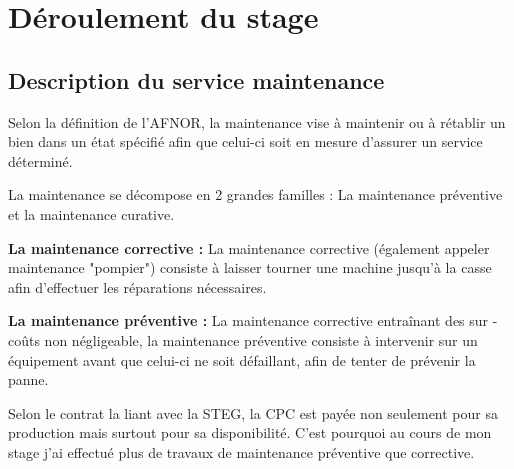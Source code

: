 \chapter{Déroulement du stage}

\section{Description du service maintenance}
Selon la définition de l'AFNOR, la maintenance vise à maintenir ou à rétablir un bien dans un état spécifié afin que celui-ci soit en mesure d'assurer un service déterminé.

La maintenance se décompose en 2 grandes familles : La maintenance préventive et la maintenance curative.

\textbf{La maintenance corrective : }La maintenance corrective (également appeler maintenance "pompier") consiste à laisser tourner une machine jusqu'à la casse afin d'effectuer les réparations nécessaires.

\textbf{La maintenance préventive : }La maintenance corrective entraînant des sur -coûts non négligeable, la maintenance préventive consiste à intervenir sur un équipement avant que celui-ci ne soit défaillant, afin de tenter de prévenir la panne. 

Selon le contrat la liant avec la STEG, la CPC est payée non seulement pour sa production mais surtout pour sa disponibilité. C'est pourquoi au cours de mon stage j'ai effectué plus de travaux de maintenance préventive que corrective.
